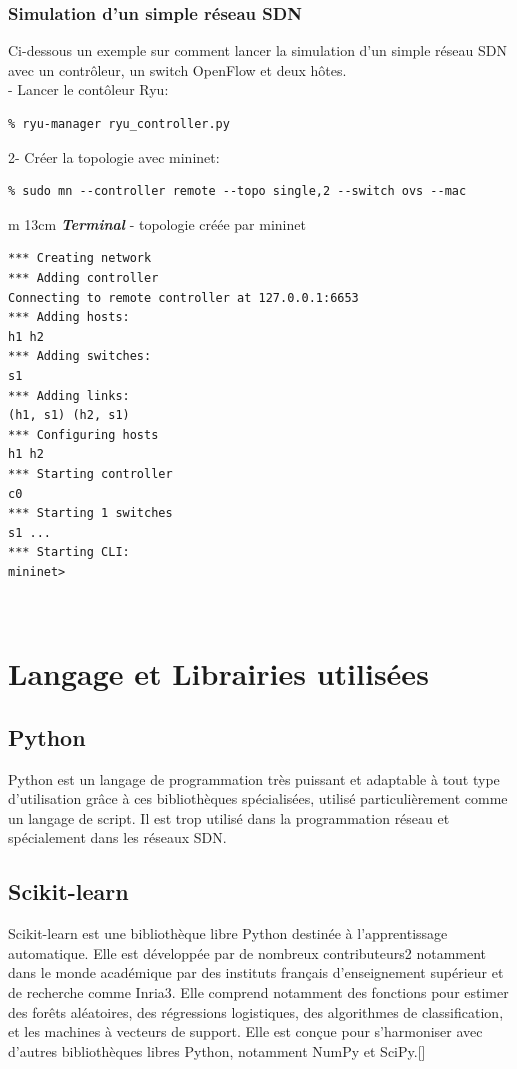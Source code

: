\subsubsection{Simulation d'un simple réseau SDN}
Ci-dessous un exemple sur comment lancer la simulation d'un simple réseau SDN avec un contrôleur, un switch OpenFlow et deux hôtes.\\

- Lancer le contôleur Ryu:
\begin{verbatim}
% ryu-manager ryu_controller.py 
\end{verbatim}
2- Créer la topologie avec mininet:
\begin{verbatim}
% sudo mn --controller remote --topo single,2 --switch ovs --mac
\end{verbatim}

\begin{tabular}{m {13cm}}
\hline
\textbf{\textit{Terminal}} - topologie créée par mininet\\
\hline
\begin{verbatim}
*** Creating network
*** Adding controller
Connecting to remote controller at 127.0.0.1:6653
*** Adding hosts:
h1 h2 
*** Adding switches:
s1 
*** Adding links:
(h1, s1) (h2, s1) 
*** Configuring hosts
h1 h2 
*** Starting controller
c0 
*** Starting 1 switches
s1 ...
*** Starting CLI:
mininet> 
\end{verbatim}\\
\hline
\end{tabular}

\section{Langage et Librairies utilisées}

\subsection{Python}
Python est un langage de programmation très puissant et adaptable à tout type d’utilisation grâce à ces bibliothèques spécialisées, utilisé particulièrement comme un langage de script. Il est trop utilisé dans la programmation réseau et spécialement dans les réseaux SDN.

\subsection{Scikit-learn}
Scikit-learn est une bibliothèque libre Python destinée à l'apprentissage automatique. Elle est développée par de nombreux contributeurs2 notamment dans le monde académique par des instituts français d'enseignement supérieur et de recherche comme Inria3. Elle comprend notamment des fonctions pour estimer des forêts aléatoires, des régressions logistiques, des algorithmes de classification, et les machines à vecteurs de support. Elle est conçue pour s'harmoniser avec d'autres bibliothèques libres Python, notamment NumPy et SciPy.[\cite{29}] 

